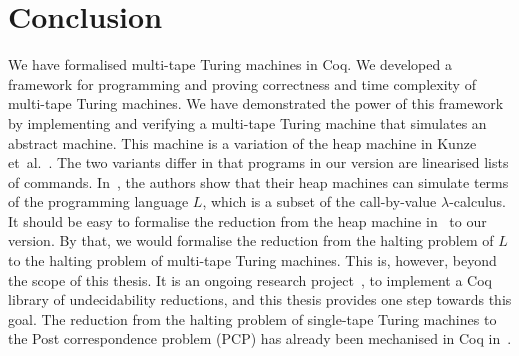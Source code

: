 \chapter{Conclusion}
\label{chap:conclusion}

We have formalised multi-tape Turing machines in Coq.  We developed a framework for programming and proving correctness and time complexity of
multi-tape Turing machines.  We have demonstrated the power of this framework by implementing and verifying a multi-tape Turing machine that simulates
an abstract machine.  This machine is a variation of the heap machine in Kunze et~al.~\cite{KunzeEtAl:2018:Formal}.  The two variants differ in that
programs in our version are linearised lists of commands.  In~\cite{KunzeEtAl:2018:Formal}, the authors show that their heap machines can simulate
terms of the programming language $L$, which is a subset of the call-by-value $\lambda$-calculus.  It should be easy to formalise the reduction from
the heap machine in~\cite{KunzeEtAl:2018:Formal} to our version.  By that, we would formalise the reduction from the halting problem of $L$ to the
halting problem of multi-tape Turing machines.  This is, however, beyond the scope of this thesis.  It is an ongoing research
project~\cite{ForsterLOLA2018}, to implement a Coq library of undecidability reductions, and this thesis provides one step towards this goal.  The
reduction from the halting problem of single-tape Turing machines to the Post correspondence problem (PCP) has already been mechanised in Coq
in~\cite{forster2018verification}.

